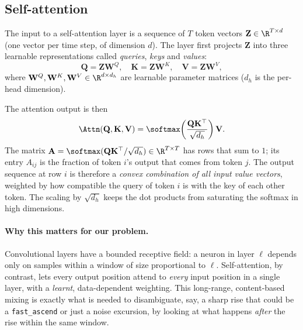 \subsection{Self-attention}
\label{sec:selfattn-theory}

The input to a self-attention layer is a sequence of $T$ token vectors
$\mathbf{Z} \in \R^{T \times d}$ (one vector per time step, of dimension
$d$). The layer first projects $\mathbf{Z}$ into three learnable
representations called \emph{queries}, \emph{keys} and \emph{values}:
\begin{equation}
    \mathbf{Q} = \mathbf{Z} \mathbf{W}^Q,
    \quad
    \mathbf{K} = \mathbf{Z} \mathbf{W}^K,
    \quad
    \mathbf{V} = \mathbf{Z} \mathbf{W}^V,
    \label{eq:qkv}
\end{equation}
where $\mathbf{W}^Q, \mathbf{W}^K, \mathbf{W}^V \in \R^{d \times d_h}$
are learnable parameter matrices ($d_h$ is the per-head dimension).

The attention output is then
\begin{equation}
    \Attn(\mathbf{Q}, \mathbf{K}, \mathbf{V})
    = \softmax\!\left( \frac{\mathbf{Q} \mathbf{K}^\top}{\sqrt{d_h}} \right) \mathbf{V}.
    \label{eq:attention}
\end{equation}
The matrix $\mathbf{A} = \softmax(\mathbf{Q} \mathbf{K}^\top / \sqrt{d_h})
\in \R^{T \times T}$ has rows that sum to $1$; its entry $A_{ij}$ is
the fraction of token $i$'s output that comes from token $j$. The
output sequence at row $i$ is therefore a \emph{convex combination of
all input value vectors}, weighted by how compatible the query of token
$i$ is with the key of each other token. The scaling by $\sqrt{d_h}$
keeps the dot products from saturating the softmax in high dimensions.

\paragraph{Why this matters for our problem.}
Convolutional layers have a bounded receptive field: a neuron in layer
$\ell$ depends only on samples within a window of size proportional to
$\ell$. Self-attention, by contrast, lets every output position attend
to \emph{every} input position in a single layer, with a
\emph{learnt}, data-dependent weighting. This long-range, content-based
mixing is exactly what is needed to disambiguate, say, a sharp rise
that could be a \texttt{fast\_ascend} or just a noise excursion, by
looking at what happens \emph{after} the rise within the same window.

